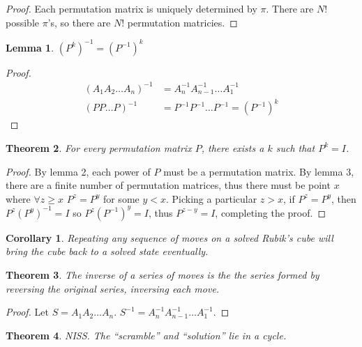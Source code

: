 \documentclass[11pt, oneside]{article}
\theoremstyle{plain}
\newtheorem{theorem}{Theorem}[section]
\newtheorem{corollary}{Corollary}[theorem]
\newtheorem{lemma}[theorem]{Lemma}
\begin{document}
\begin{proof}
Each permutation matrix is uniquely determined by \( \pi \).
There are \( N! \) possible \( \pi \)'s, so there are \( N! \) permutation matricies.
\end{proof}

\begin{lemma}
\( (P^k)^{-1} = (P^{-1})^k \)
\end{lemma}

\begin{proof}
\begin{align*}
(A_1 A_2 \dots A_n)^{-1} &= A_n^{-1} A_{n - 1}^{-1} \dots A_1^{-1} \\
(P P \dots P)^{-1} &= P^{-1} P^{-1} \dots P^{-1} = (P^{-1})^k
\end{align*}
\end{proof}

\begin{theorem}
For every permutation matrix \( P \), there exists a \( k \) such that \( P^k = I \).
\end{theorem}

\begin{proof}
By lemma 2, each power of \( P \) must be a permutation matrix.
By lemma 3, there are a finite number of permutation matrices, thus
there must be point \( x \) where \( \forall z \geq x \) \( P^z = P^y \)
for some \( y < x \). Picking a particular \( z > x \), if \( P^z = P^y \), then \( P^z (P^y)^{-1} = I \)
so \( P^z (P^{-1})^y = I \), thus \( P^{z - y} = I \), completing the proof.
\end{proof}

\begin{corollary}
Repeating any sequence of moves on a solved Rubik's cube will bring
the cube back to a solved state eventually.
\end{corollary}

\begin{theorem}
The inverse of a series of moves is the the series formed by reversing the original series, inversing each move.
\end{theorem}

\begin{proof}
Let \( S = A_1 A_2 \dots A_n \). \( S^{-1} =  A_n^{-1} A_{n - 1}^{-1} \dots A_1^{-1} \).
\end{proof}

\newpage

\begin{theorem}
NISS. The ``scramble'' and ``solution'' lie in a cycle.
\end{theorem}
\end{document}
